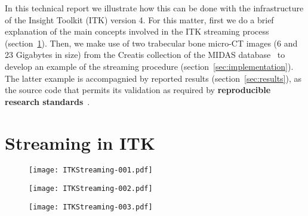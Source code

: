\documentclass{InsightArticle}
\begin{document}
In this technical report we illustrate how this can be done with the
infrastructure of the Insight Toolkit (ITK) version 4. For this matter, first we do a
brief explanation of the main concepts involved in the ITK streaming process
(section~\ref{sec:stream}). Then, we make use of two trabecular bone micro-CT images
(6 and 23 Gigabytes in size) from the Creatis collection of the MIDAS
database~\cite{Zuluaga2011a} to develop an example of the streaming procedure
(section~\ref{sec:implementation}). The latter example is accompagnied by
reported results (section~\ref{sec:results}), as the source code
that permits its validation as required by \textbf{reproducible research
standards}~\cite{Stodden2009}.

\section{Streaming in ITK}
\label{sec:stream}

\begin{figure}
\center
\texttt{[image: ITKStreaming-001.pdf]}
\label{fig:StreamingFigure1}
\end{figure}

\begin{figure}
\center
\texttt{[image: ITKStreaming-002.pdf]}
\label{fig:StreamingFigure1}
\end{figure}

\begin{figure}
\center
\texttt{[image: ITKStreaming-003.pdf]}
\label{fig:StreamingFigure1}
\end{figure}
\end{document}
